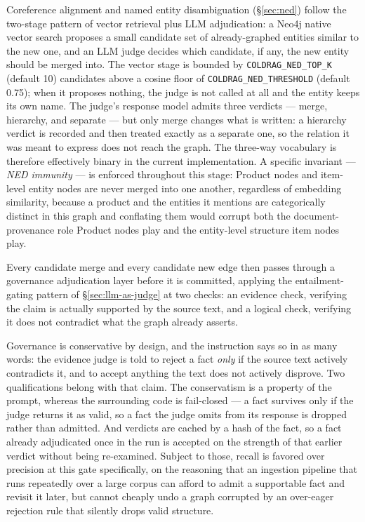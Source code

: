 Coreference alignment and named entity disambiguation (\S\ref{sec:ned}) follow the two-stage pattern of vector retrieval plus LLM adjudication: a Neo4j native vector search proposes a small candidate set of already-graphed entities similar to the new one, and an LLM judge decides which candidate, if any, the new entity should be merged into. The vector stage is bounded by \texttt{COLDRAG\_NED\_TOP\_K} (default 10) candidates above a cosine floor of \texttt{COLDRAG\_NED\_THRESHOLD} (default 0.75); when it proposes nothing, the judge is not called at all and the entity keeps its own name. The judge's response model admits three verdicts — merge, hierarchy, and separate — but only merge changes what is written: a hierarchy verdict is recorded and then treated exactly as a separate one, so the relation it was meant to express does not reach the graph. The three-way vocabulary is therefore effectively binary in the current implementation. A specific invariant — \emph{NED immunity} — is enforced throughout this stage: Product nodes and item-level entity nodes are never merged into one another, regardless of embedding similarity, because a product and the entities it mentions are categorically distinct in this graph and conflating them would corrupt both the document-provenance role Product nodes play and the entity-level structure item nodes play.

Every candidate merge and every candidate new edge then passes through a governance adjudication layer before it is committed, applying the entailment-gating pattern of \S\ref{sec:llm-as-judge} at two checks: an evidence check, verifying the claim is actually supported by the source text, and a logical check, verifying it does not contradict what the graph already asserts. 

Governance is conservative by design, and the instruction says so in as many words: the evidence judge is told to reject a fact \emph{only} if the source text actively contradicts it, and to accept anything the text does not actively disprove. Two qualifications belong with that claim. The conservatism is a property of the prompt, whereas the surrounding code is fail-closed — a fact survives only if the judge returns it as valid, so a fact the judge omits from its response is dropped rather than admitted. And verdicts are cached by a hash of the fact, so a fact already adjudicated once in the run is accepted on the strength of that earlier verdict without being re-examined. Subject to those, recall is favored over precision at this gate specifically, on the reasoning that an ingestion pipeline that runs repeatedly over a large corpus can afford to admit a supportable fact and revisit it later, but cannot cheaply undo a graph corrupted by an over-eager rejection rule that silently drops valid structure. 

